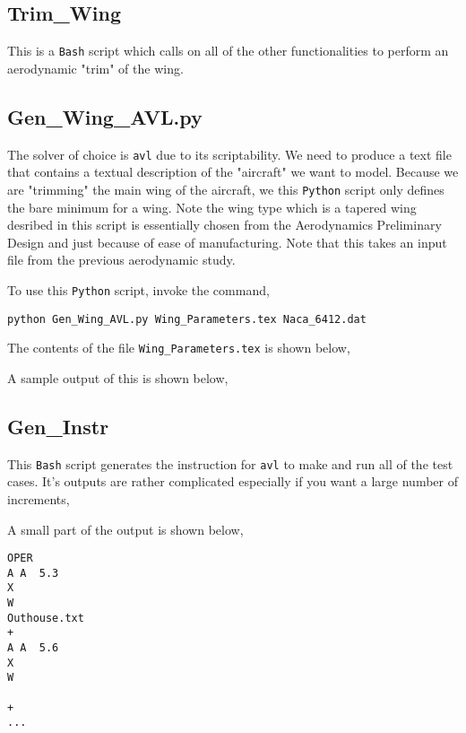 \subsection{Trim\_Wing}
\begin{comment}
\end{comment}
This is a \texttt{Bash} script which calls on all of the other functionalities to perform an aerodynamic "trim" of the wing.


\subsection{Gen\_Wing\_AVL.py}
\begin{comment}
\end{comment}
The solver of choice is \texttt{avl} due to its scriptability. We need to produce a text file that contains a textual description of the "aircraft" we want to model. Because we are "trimming" the main wing of the aircraft, we this \texttt{Python} script only defines the bare minimum for a wing. Note the wing type which is a tapered wing desribed in this script is essentially chosen from the Aerodynamics Preliminary Design and just because of ease of manufacturing. Note that this takes an input file from the previous aerodynamic study.

To use this \texttt{Python} script, invoke the command,
\begin{lstlisting}
python Gen_Wing_AVL.py Wing_Parameters.tex Naca_6412.dat
\end{lstlisting}
The contents of the file \texttt{Wing\_Parameters.tex}  is shown below,

A sample output of this is shown below,


\subsection{Gen\_Instr}
\begin{comment}
\end{comment}
This \texttt{Bash} script generates the instruction for \texttt{avl} to make and run all of the test cases. It's outputs are rather complicated especially if you want a large number of increments,

A small part of the output is shown below,
\begin{lstlisting}
OPER
A A  5.3
X
W
Outhouse.txt
+
A A  5.6
X
W
 
+
...
\end{lstlisting}

